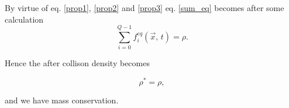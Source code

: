 By virtue of eq. \ref{prop1}, \ref{prop2} and \ref{prop3} eq. \ref{sum_eq} becomes after some calculation
\begin{equation}
    \sum_{i=0}^{Q-1} f_i^{eq}(\vec{x}, \, t) =  \rho.
\end{equation}

Hence the after collison density becomes

\begin{equation}
    \rho^* = \rho,
\end{equation}

and we have mass conservation.

